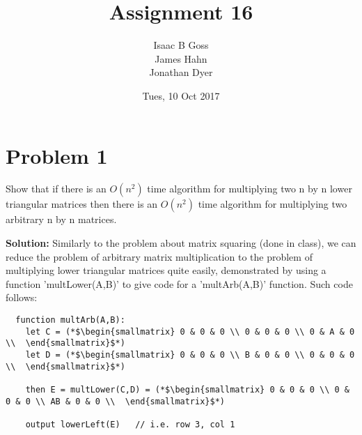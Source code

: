 \documentclass{article}
\author{Isaac B Goss\\ James Hahn\\ Jonathan Dyer}
\title{Assignment 16}
\date{Tues, 10 Oct 2017}
\providecommand{\prob}[1]{\section*{Problem #1}}
\providecommand{\soln}{\textbf{Solution: }}
\begin{document}
\maketitle





\prob{1}
Show that if there is an $O\left(n^2\right)$ time algorithm for multiplying two n by n lower triangular matrices then there is an $O\left(n^2\right)$ time algorithm for multiplying two arbitrary n by n matrices.

\soln Similarly to the problem about matrix squaring (done in class), we can reduce the problem of arbitrary matrix multiplication to the problem of multiplying lower triangular matrices quite easily, demonstrated by using a function 'multLower(A,B)' to give code for a 'multArb(A,B)' function. Such code follows:

\begin{lstlisting}
  function multArb(A,B):
    let C = (*$\begin{smallmatrix} 0 & 0 & 0 \\ 0 & 0 & 0 \\ 0 & A & 0 \\  \end{smallmatrix}$*)
    let D = (*$\begin{smallmatrix} 0 & 0 & 0 \\ B & 0 & 0 \\ 0 & 0 & 0 \\  \end{smallmatrix}$*)

    then E = multLower(C,D) = (*$\begin{smallmatrix} 0 & 0 & 0 \\ 0 & 0 & 0 \\ AB & 0 & 0 \\  \end{smallmatrix}$*)

    output lowerLeft(E)   // i.e. row 3, col 1

\end{lstlisting}
\end{document}

